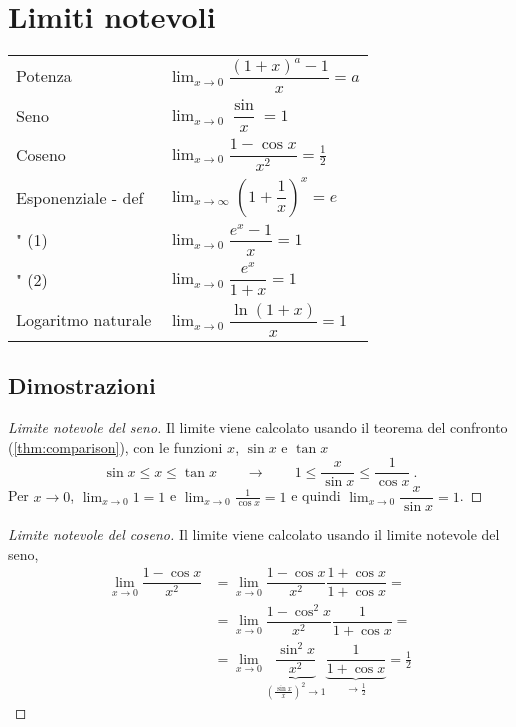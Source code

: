 \section{Limiti notevoli}
\begin{center}
\begin{tabular}{ll}
    Potenza            & $\displaystyle\lim_{x \rightarrow 0} \dfrac{(1+x)^a - 1}{x} = a$ \\
    Seno               & $\displaystyle\lim_{x \rightarrow 0} \dfrac{\sin}{x} = 1$ \\
    Coseno             & $\displaystyle\lim_{x \rightarrow 0} \dfrac{1 - \cos x}{x^2} = \frac{1}{2}$ \\
    Esponenziale - def & $\displaystyle\lim_{x \rightarrow \infty} \left( 1 + \dfrac{1}{x} \right)^x = e$ \\
    \qquad " \qquad (1)& $\displaystyle\lim_{x \rightarrow 0} \dfrac{e^x - 1}{x} = 1$ \\
    \qquad " \qquad (2)& $\displaystyle\lim_{x \rightarrow 0} \dfrac{e^{x}}{1+x} = 1$ \\
    Logaritmo naturale & $\displaystyle\lim_{x \rightarrow 0} \dfrac{\ln (1+x)}{x} = 1$ \\
\end{tabular}
\end{center}

\subsection{Dimostrazioni}
\begin{proof}[Limite notevole del seno] Il limite viene calcolato usando il teorema del confronto (\ref{thm:comparison}), con le funzioni $x$, $\sin x$ e $\tan x$
    \begin{equation}
        \sin x \le x \le \tan x \qquad \rightarrow \qquad 1 \le \dfrac{x}{\sin{x}} \le \dfrac{1}{\cos x} \ .
    \end{equation}
    Per $x \rightarrow 0$, $\displaystyle\lim_{x \rightarrow 0} 1 = 1$ e $\displaystyle\lim_{x \rightarrow 0} \frac{1}{\cos x} = 1$ e quindi $ \lim_{x \rightarrow 0} \dfrac{ x }{\sin x} = 1 $.
\end{proof}
\begin{proof}[Limite notevole del coseno] Il limite viene calcolato usando il limite notevole del seno,
    \begin{equation}
        \begin{aligned}
            \lim_{x \rightarrow 0} \dfrac{1 - \cos x}{x^2} 
            & = \lim_{x \rightarrow 0} \dfrac{1 - \cos x}{x^2} \dfrac{1+\cos x}{1+\cos x} = \\
            & = \lim_{x \rightarrow 0} \dfrac{1 - \cos^2 x}{x^2} \dfrac{1}{1+\cos x} = \\ 
            & = \lim_{x \rightarrow 0} \underbrace{\dfrac{\sin^2 x}{x^2}}_{\left( \frac{\sin x}{x} \right)^2 \rightarrow 1} \underbrace{\dfrac{1}{1+\cos x}}_{\rightarrow \frac{1}{2}} = \frac{1}{2}
        \end{aligned}
    \end{equation}
\end{proof}

